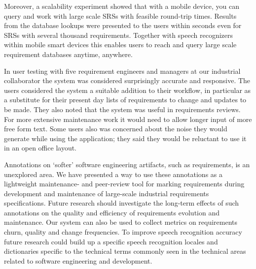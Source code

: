 \documentclass[conference]{IEEEtran}
\begin{document}

Moreover, a scalability experiment showed that with a mobile device, you can query and work with large scale SRSs with feasible round-trip times. 
Results from the database lookups were presented to the users within seconds even for SRSs with several thousand requirements.
Together with speech recognizers within mobile smart devices this enables users to reach and query large scale requirement databases anytime, anywhere.

In user testing with five requirement engineers and managers at our industrial collaborator the system was considered surprisingly 
accurate and responsive.
The users considered the system a suitable addition to their workflow, in particular as a substitute for their present day lists of requirements to change and updates to be made.
They also noted that the system was useful in requirements reviews.
For more extensive maintenance work it would need to allow longer input of more free form text.
Some users also was concerned about the noise they would generate while using the application; they said they would be reluctant to use it in an open office layout.

Annotations on `softer' software engineering artifacts, such as requirements, is an unexplored area. 
We have presented a way to use these annotations as a lightweight maintenance- and peer-review tool for marking requirements during development and maintenance of large-scale industrial requirements specifications. 
Future research should investigate the long-term effects of such annotations on the quality and efficiency of requirements evolution and maintenance.
Our system can also be used to collect metrics on requirements churn, quality and change frequencies.
To improve speech recognition accuracy future research could build up a specific speech recognition locales and dictionaries specific to the technical terms commonly seen in the technical areas related to software engineering and development.
\end{document}
